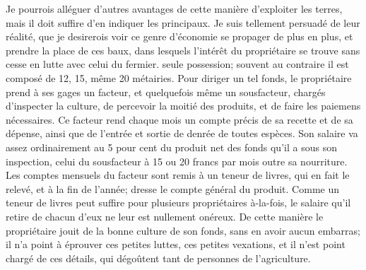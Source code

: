 Je pourrois alléguer d'autres avantages de cette manière d'exploiter les terres, mais il doit suffire d'en indiquer les principaux. Je suis tellement persuadé de leur réalité, que je desirerois voir ce genre d'économie se propager de plus en plus, et prendre la place de ces baux, dans lesquels l'intérêt du propriétaire se trouve sans cesse en lutte avec celui du fermier.\setcounter{page}{182} seule possession; souvent au contraire il est composé de 12, 15, même 20 métairies. Pour diriger un tel fonds, le propriétaire prend à ses gages un facteur, et quelquefois même un sousfacteur, chargés d'inspecter la culture, de percevoir la moitié des produits, et de faire les paiemens nécessaires. Ce facteur rend chaque mois un compte précis de sa recette et de sa dépense, ainsi que de l'entrée et sortie de denrée de toutes espèces. Son salaire va assez ordinairement au 5 pour cent du produit net des fonds qu'il a sous son inspection, celui du sousfacteur à 15 ou 20 francs par mois outre sa nourriture.
Les comptes mensuels du facteur sont remis à un teneur de livres, qui en fait le relevé, et à la fin de l'année; dresse le compte général du produit. Comme un teneur de livres peut suffire pour plusieurs propriétaires à-la-fois, le salaire qu'il retire de chacun d'eux ne leur est nullement onéreux. De cette manière le propriétaire jouit de la bonne culture de son fonds, sans en avoir aucun embarras; il n'a point à éprouver ces petites luttes, ces petites vexations, et il n'est point chargé de ces détails, qui dégoûtent tant de personnes de l'agriculture.